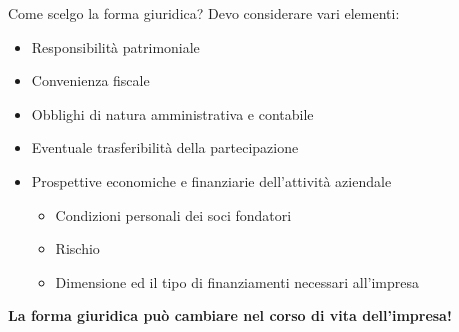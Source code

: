 \documentclass[../main.tex]{subfiles}
\begin{document}
Come scelgo la forma giuridica? Devo considerare vari elementi:

\begin{itemize}
\item Responsibilità patrimoniale
\item Convenienza fiscale
\item Obblighi di natura amministrativa e contabile
\item Eventuale trasferibilità della partecipazione
\item Prospettive economiche e finanziarie dell'attività aziendale
\begin{itemize}
\item Condizioni personali dei soci fondatori
\item Rischio
\item Dimensione ed il tipo di finanziamenti necessari all'impresa
\end{itemize}
\end{itemize}

\textbf{La forma giuridica può cambiare nel corso di vita dell'impresa!}
\end{document}
